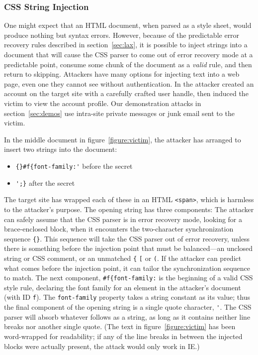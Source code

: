 \documentclass{acm_proc_article-sp}
\begin{document}
\subsubsection{CSS String Injection}
One might expect that an HTML document, when parsed as a style sheet,
would produce nothing but syntax errors.  However, because of the
predictable error recovery rules described in section~\ref{sec:lax},
it is possible to inject strings into a document that will cause the
CSS parser to come out of error recovery mode at a predictable point,
consume some chunk of the document as a \emph{valid} rule, and then
return to skipping.  Attackers have many options for injecting text
into a web page, even one they cannot see without authentication.  In
\cite{cssxss08} the attacker created an account on the target site
with a carefully crafted user handle, then induced the victim to view
the account profile.  Our demonstration attacks in
section~\ref{sec:demos} use intra-site private messages or junk
email sent to the victim.

In the middle document in figure~\ref{figure:victim}, the attacker has
arranged to insert two strings into the document:
\begin{itemize}
\item \verb|{}#f{font-family:'| before the secret
\item \verb|';}| after the secret
\end{itemize}
The target site has wrapped each of these in an HTML \verb|<span>|,
which is harmless to the attacker's purpose.  The opening string has
three components: The attacker can safely assume that the CSS parser
is in error recovery mode, looking for a brace-enclosed block, when it
encounters the two-character synchronization sequence \verb|{}|.  This
sequence will take the CSS parser out of error recovery, unless there
is something before the injection point that must be balanced---an
unclosed string or CSS comment, or an unmatched \verb|{| \verb|[| or
\verb|(|.  If the attacker can predict what comes before the injection
point, it can tailor the synchronization sequence to match.  The next
component, \verb|#f{font-family:| is the beginning of a valid CSS
style rule, declaring the font family for an element in the attacker's
document (with ID \texttt{f}).  The \texttt{font-family} property
takes a string constant as its value; thus the final component of the
opening string is a single quote character, \verb|'|.  The CSS parser
will absorb whatever follows as a string, as long as it contains
neither line breaks nor another single quote.  (The text in
figure~\ref{figure:victim} has been word-wrapped for readability; if
any of the line breaks in between the injected blocks were actually
present, the attack would only work in IE.)
\end{document}
